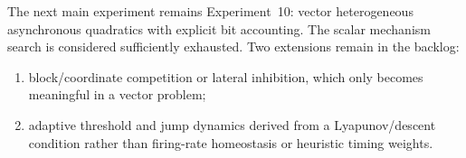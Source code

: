 The next main experiment remains Experiment~10: vector heterogeneous asynchronous quadratics with explicit bit accounting. The scalar mechanism search is considered sufficiently exhausted. Two extensions remain in the backlog:
\begin{enumerate}
  \item block/coordinate competition or lateral inhibition, which only becomes meaningful in a vector problem;
  \item adaptive threshold and jump dynamics derived from a Lyapunov/descent condition rather than firing-rate homeostasis or heuristic timing weights.
\end{enumerate}
